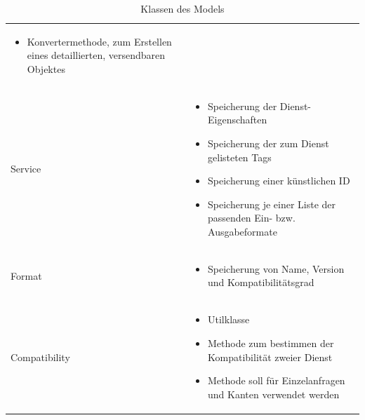 \begin{table}[h]
\begin{tabularx}{\textwidth}{p{} | X}
\begin{itemize}
			\item Konvertermethode, zum Erstellen eines detaillierten, versendbaren Objektes
		\end{itemize} \\
		Service & \compress \begin{itemize}
			\item Speicherung der Dienst-Eigenschaften
			\item Speicherung der zum Dienst gelisteten Tags
			\item Speicherung einer künstlichen ID
			\item Speicherung je einer Liste der passenden Ein- bzw. Ausgabeformate
		\end{itemize} \\
		\rowcolor[HTML]{E7E7E7}
		Format & \compress \begin{itemize}
			\item Speicherung von Name, Version und Kompatibilitätsgrad
		\end{itemize} \\
		Compatibility & \compress \begin{itemize}
			\item Utilklasse
			\item Methode zum bestimmen der Kompatibilität zweier Dienst
			\item Methode soll für Einzelanfragen und Kanten verwendet werden
		\end{itemize} \\
	\end{tabularx}
	\caption{Klassen des Models}
	\label{table:klassenbeschreibung-a}
\end{table}

